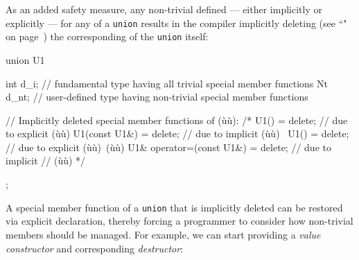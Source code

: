 \noindent As an added safety measure, any non-trivial  defined --- either implicitly or explicitly --- for any
 of a \lstinline!union! results in the compiler implicitly
deleting (see %
``" on page~\pageref{deleted-functions}) the corresponding  of the \lstinline!union! itself:

\begin{emcppslisting}[emcppsbatch=e2]
union U1
{
    int d_i;   // fundamental type having all trivial special member functions
    Nt  d_nt;  // user-defined type having non-trivial special member functions

    // Implicitly deleted special member functions of (ù{}ù):
    /*
        U1()                     = delete; // due to explicit (ù{}ù)
        U1(const U1&)            = delete; // due to implicit (ù{}ù)
        ~U1()                    = delete; // due to explicit (ù{}ù)~(ù{}ù)
        U1& operator=(const U1&) = delete; // due to implicit
                                           // (ù{}ù)
    */
};
\end{emcppslisting}


A special member function of a \lstinline!union! that is implicitly deleted
can be restored via explicit declaration, thereby forcing a programmer
to consider how non-trivial members should be managed. For example,
we can start providing a \emph{value constructor} and corresponding
\emph{destructor}:

